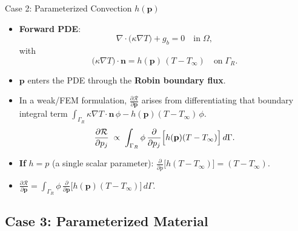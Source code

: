 \documentclass[10pt,aspectratio=169]{beamer}
\begin{document}
\begin{frame}{Case 2: Parameterized Convection \(h(\mathbf{p})\)}
\small
\begin{itemize}
    \item \textbf{Forward PDE}: 
      \[
        \nabla \cdot \bigl(\kappa\nabla T\bigr) + g_b = 0
        \quad\text{in}\;\Omega,
      \]
      with 
      \[
        \bigl(\kappa\nabla T\bigr)\cdot \mathbf{n}
        = h(\mathbf{p})\,(T - T_\infty)
        \quad\text{on}\;\Gamma_R.
      \]
    \item \(\mathbf{p}\) enters the PDE through the \textbf{Robin boundary flux}.
    \item In a weak/FEM formulation, \(\frac{\partial \mathcal{R}}{\partial \mathbf{p}}\) arises from differentiating that boundary integral term \(\int_{\Gamma_R} \kappa \nabla T \cdot \mathbf{n}\,\phi - h(\mathbf{p})(T - T_\infty)\,\phi\).
    \[
       \frac{\partial \mathcal{R}}{\partial p_j}
       \;\propto\;
       \int_{\Gamma_R}
         \phi\,\frac{\partial}{\partial p_j} \Bigl[h(\mathbf{p})(T - T_\infty)\Bigr]
       \,d\Gamma.
    \]
    \item \textbf{If} \(h = p\) (a single scalar parameter):
      \(\displaystyle
       \frac{\partial}{\partial p} \bigl[h(T - T_\infty)\bigr]
       = (T - T_\infty).
      \)
    \item \(\boxed{\frac{\partial \mathcal{R}}{\partial \mathbf{p}}
           = 
           \int_{\Gamma_R}
             \phi\,
             \frac{\partial}{\partial \mathbf{p}}
             \bigl[h(\mathbf{p})(T - T_\infty)\bigr]
           \,d\Gamma}\).
\end{itemize}
\end{frame}


\subsection{Case 3: Parameterized Material}
\end{document}
